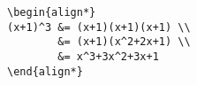 \documentclass{article}
\newenvironment{exampletwoup}
  {\VerbatimEnvironment
   \begin{VerbatimOut}{example.out}}
  {\end{VerbatimOut}
   \setlength{\parindent}{0pt}
   \fbox{\begin{tabular}{l|l}
   \begin{minipage}{0.55\linewidth}
     \inputminted[fontsize=\small,resetmargins]{latex}{example.out}
   \end{minipage} &
   \begin{minipage}{0.35\linewidth}
     
   \end{minipage}
\end{tabular}}}
\begin{document}



\begin{center}
\begin{verbatim}
\begin{align*}
(x+1)^3 &= (x+1)(x+1)(x+1) \\
        &= (x+1)(x^2+2x+1) \\
        &= x^3+3x^2+3x+1
\end{align*}
\end{verbatim}
\end{center}



\end{document}

